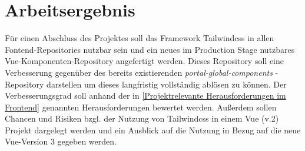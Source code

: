 \chapter{Arbeitsergebnis}
\label{cha:Arbeitsergebnis}

Für einen Abschluss des Projektes soll das Framework Tailwindcss in allen Fontend-Repositories nutzbar sein und ein neues im Production Stage nutzbares Vue-Komponenten-Repository angefertigt werden. Dieses Repository soll eine Verbesserung gegenüber des bereits existierenden \textit{portal-global-components} - Repository darstellen um dieses langfristig vollständig ablösen zu können. Der Verbesserungsgrad soll anhand der in \autoref{Projektrelevante Herausforderungen im Frontend} genannten Herausforderungen bewertet werden. Außerdem sollen Chancen und Risiken bzgl. der Nutzung von Tailwindcss in einem Vue (v.2) Projekt dargelegt werden und ein Ausblick auf die Nutzung in Bezug auf die neue Vue-Version 3 gegeben werden.